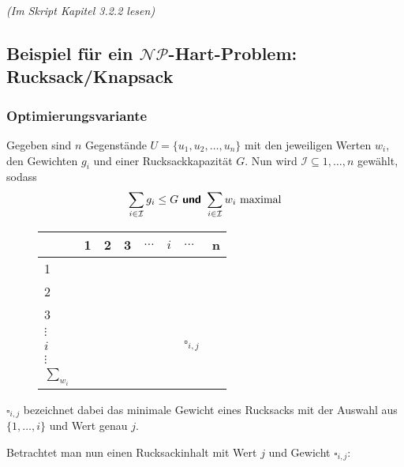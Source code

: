 \documentclass{scrartcl}%
\begin{document}
    \textit{(Im Skript Kapitel 3.2.2 lesen)}

    \subsection*{Beispiel für ein $\mathcal{N}\mathcal{P}$-Hart-Problem: Rucksack/Knapsack}
    \subsubsection*{Optimierungsvariante}
    Gegeben sind $n$ Gegenstände $U=\{u_1,u_2,\dots,u_n\}$ mit den jeweiligen
    Werten $w_i$, den Gewichten $g_i$ und einer Rucksackkapazität $G$.
    Nun wird $\mathcal{I} \subseteq {1, \dots, n}$ gewählt, sodass
    \begin{equation*}
        \sum_{i \in \mathcal{I}} g_i \leq G \text{\textbf{\textsf{ und }}} \sum_{i \in \mathcal{I}} w_i \text{ maximal}
    \end{equation*}

    \begin{figure}[H]
        \centering
        \begin{table}[H]
            \centering
            \begin{tabular}{C{1cm}|C{0.5cm}C{0.5cm}C{0.5cm}C{0.5cm}C{0.5cm}C{0.5cm}C{0.5cm}}
               & 1 & 2 & 3 & $\dots$ & $i$ & $\dots$ & n \\  &  &  &  &  &  &  &  \\
               2 &  &  &  &  &  &  &  \\
               3 &  &  &  &  &  &  &  \\
               $\vdots$ &  &  &  &  &  &  &  \\
               $i$ &  &  &  &  &  & $\square_{i,j}$ &  \\
               $\vdots$ &  &  &  &  &  &  &  \\
               $\sum_{w_i}$ &  &  &  &  &  &  &  \\

            \end{tabular}
        \end{table}
    \end{figure}

    $\square_{i,j}$ bezeichnet dabei das minimale Gewicht eines Rucksacks mit der Auswahl aus $\{1, \dots, i\}$ und Wert genau $j$.

    \vspace*{0.3cm}
    Betrachtet man nun einen Rucksackinhalt mit Wert $j$ und Gewicht $\square_{i,j}$:
\end{document}
